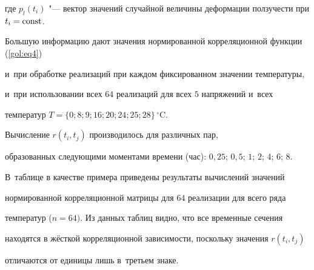где $p_l(t_i)$ "--- вектор значений случайной величины деформации ползучести при $t_i = \rm const$.



Большую информацию дают значения нормированной корреляционной функции (\ref{gol:eq4})

и~при обработке реализаций при каждом фиксированном значении температуры,

и~при использовании всех $64$ реализаций для всех $5$ напряжений и~всех

температур $T=\{ 0; 8; 9; 16; 20; 24; 25; 28 \}\, ^\circ$C.

Вычисление $r(t_i, t_j )$ производилось для различных пар,

образованных следующими моментами времени (час): $0,25$; $0,5$; $1$; $2$; $4$; $6$; $8$.

В~таблице в качестве примера приведены результаты вычислений значений

нормированной корреляционной матрицы для $64$ реализации для всего ряда

температур ($n=64)$. Из данных таблиц видно, что все временные сечения

находятся в жёсткой корреляционной зависимости, поскольку значения $r(t_i, t_j )$

отличаются от единицы лишь в~третьем знаке.



